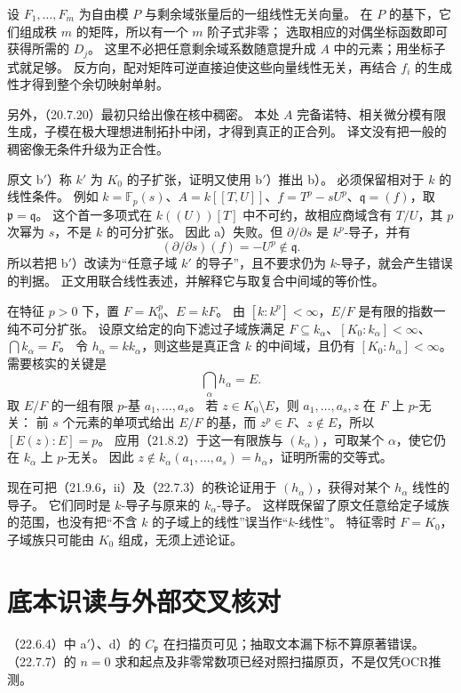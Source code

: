 设 $F_1,\ldots,F_m$ 为自由模 $P$ 与剩余域张量后的一组线性无关向量。
在 $P$ 的基下，它们组成秩 $m$ 的矩阵，所以有一个 $m$ 阶子式非零；
选取相应的对偶坐标函数即可获得所需的 $D_j$。
这里不必把任意剩余域系数随意提升成 $A$ 中的元素；用坐标子式就足够。
反方向，配对矩阵可逆直接迫使这些向量线性无关，再结合 $f_i$ 的生成性才得到整个余切映射单射。

另外，（20.7.20）最初只给出像在核中稠密。
本处 $A$ 完备诺特、相关微分模有限生成，子模在极大理想进制拓扑中闭，才得到真正的正合列。
译文没有把一般的稠密像无条件升级为正合性。

原文 b$'$）称 $k'$ 为 $K_0$ 的子扩张，证明又使用 b$'$）推出 b）。
必须保留相对于 $k$ 的线性条件。
例如 $k=\mathbb F_p(s)$、$A=k[[T,U]]$、$f=T^p-sU^p$、$\mathfrak q=(f)$，取 $\mathfrak p=\mathfrak q$。
这个首一多项式在 $k((U))[T]$ 中不可约，故相应商域含有 $T/U$，其 $p$ 次幂为 $s$，不是 $k$ 的可分扩张。
因此 a）失败。但 $\partial/\partial s$ 是 $k^p$-导子，并有
\[
 (\partial/\partial s)(f)=-U^p\notin\mathfrak q.
\]
所以若把 b$'$）改读为“任意子域 $k'$ 的导子”，且不要求仍为 $k$-导子，就会产生错误的判据。
正文用联合线性表述，并解释它与取复合中间域的等价性。

在特征 $p>0$ 下，置 $F=K_0^p$、$E=kF$。
由 $[k:k^p]<\infty$，$E/F$ 是有限的指数一纯不可分扩张。
设原文给定的向下滤过子域族满足 $F\subseteq k_\alpha$、$[K_0:k_\alpha]<\infty$、$\bigcap k_\alpha=F$。
令 $h_\alpha=kk_\alpha$，则这些是真正含 $k$ 的中间域，且仍有 $[K_0:h_\alpha]<\infty$。
需要核实的关键是
\[
 \bigcap_\alpha h_\alpha=E.
\]
取 $E/F$ 的一组有限 $p$-基 $a_1,\ldots,a_s$。
若 $z\in K_0\setminus E$，则 $a_1,\ldots,a_s,z$ 在 $F$ 上 $p$-无关：
前 $s$ 个元素的单项式给出 $E/F$ 的基，而 $z^p\in F$、$z\notin E$，所以 $[E(z):E]=p$。
应用（21.8.2）于这一有限族与 $(k_\alpha)$，可取某个 $\alpha$，使它仍在 $k_\alpha$ 上 $p$-无关。
因此 $z\notin k_\alpha(a_1,\ldots,a_s)=h_\alpha$，证明所需的交等式。

现在可把（21.9.6，ii）及（22.7.3）的秩论证用于 $(h_\alpha)$，获得对某个 $h_\alpha$ 线性的导子。
它们同时是 $k$-导子与原来的 $k_\alpha$-导子。
这样既保留了原文任意给定子域族的范围，也没有把“不含 $k$ 的子域上的线性”误当作“$k$-线性”。
特征零时 $F=K_0$，子域族只可能由 $K_0$ 组成，无须上述论证。

\section*{底本识读与外部交叉核对}
（22.6.4）中 a$'$）、d）的 $C_{\mathfrak p}$ 在扫描页可见；抽取文本漏下标不算原著错误。
（22.7.7）的 $n=0$ 求和起点及非零常数项已经对照扫描原页，不是仅凭OCR推测。


